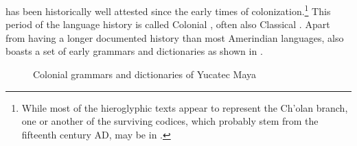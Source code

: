 \documentclass[output=paper]{langsci/langscibook}
\begin{document}
  has been historically well attested since the early times of  colonization.\footnote{While most of the hieroglyphic texts appear to represent the Ch'olan branch, one or another of the surviving codices, which probably stem from the fifteenth century AD, may be in .} This period of the language history is called Colonial  , often also Classical  . Apart from having a longer documented history than most Amerindian languages,   also boasts a set of early grammars and dictionaries as shown in %
.

\begin{figure}
\caption{Colonial grammars and dictionaries of Yucatec Maya}\label{fig:lehmann:3}
% 

\startchronology[startyear=1500,stopyear=1800,startdate=false,stopdate=false,width=.9\textwidth]
\stopchronology
\vspace*{2\baselineskip}
\end{figure}
\end{document}
